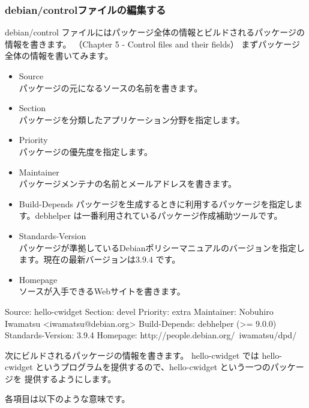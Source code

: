 \documentclass[mingoth,a4paper]{jsarticle}
\begin{document}
\subsubsection{debian/controlファイルの編集する}

debian/control ファイルにはパッケージ全体の情報とビルドされるパッケージの情報を書きます。
（Chapter 5 - Control files and their fields）
まずパッケージ全体の情報を書いてみます。

\begin{itemize}
\item Source \\
パッケージの元になるソースの名前を書きます。
\item Section\\
パッケージを分類したアプリケーション分野を指定します。
\item Priority\\
パッケージの優先度を指定します。
\item Maintainer\\
パッケージメンテナの名前とメールアドレスを書きます。
\item Build-Depends
パッケージを生成するときに利用するパッケージを指定します。debhelper は一番利用されているパッケージ作成補助ツールです。
\item Standards-Version\\
パッケージが準拠しているDebianポリシーマニュアルのバージョンを指定します。現在の最新バージョンは3.9.4 です。
\item Homepage\\
ソースが入手できるWebサイトを書きます。
\end{itemize}

\begin{commandline}
Source: hello-cwidget
Section: devel
Priority: extra
Maintainer: Nobuhiro Iwamatsu <iwamatsu@debian.org>
Build-Depends: debhelper (>= 9.0.0)
Standards-Version: 3.9.4
Homepage: http://people.debian.org/~iwamatsu/dpd/
\end{commandline}

次にビルドされるパッケージの情報を書きます。
hello-cwidget では hello-cwidget というプログラムを提供するので、hello-cwidget という一つのパッケージを
提供するようにします。

各項目は以下のような意味です。
\end{document}
